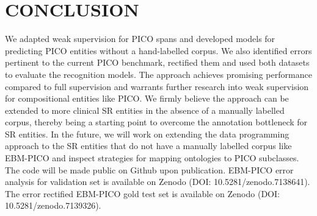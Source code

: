 \documentclass[10.7pt,]{article}
\begin{document}
\section{CONCLUSION}\label{conclusion}
%
We adapted weak supervision for PICO spans and developed models for predicting PICO entities without a hand-labelled corpus.
We also identified errors pertinent to the current PICO benchmark, rectified them and used both datasets to evaluate the recognition models.
The approach achieves promising performance compared to full supervision and warrants further research into weak supervision for compositional entities like PICO.
We firmly believe the approach can be extended to more clinical SR entities in the absence of a manually labelled corpus, thereby being a starting point to overcome the annotation bottleneck for SR entities.
In the future, we will work on extending the data programming approach to the SR entities that do not have a manually labelled corpus like EBM-PICO and inspect strategies for mapping ontologies to PICO subclasses.
The code will be made public on Github upon publication.
EBM-PICO error analysis for validation set is available on Zenodo (DOI: 10.5281/zenodo.7138641). 
The error rectified EBM-PICO gold test set is available on Zenodo (DOI: 10.5281/zenodo.7139326).
%
%
%
\end{document}
